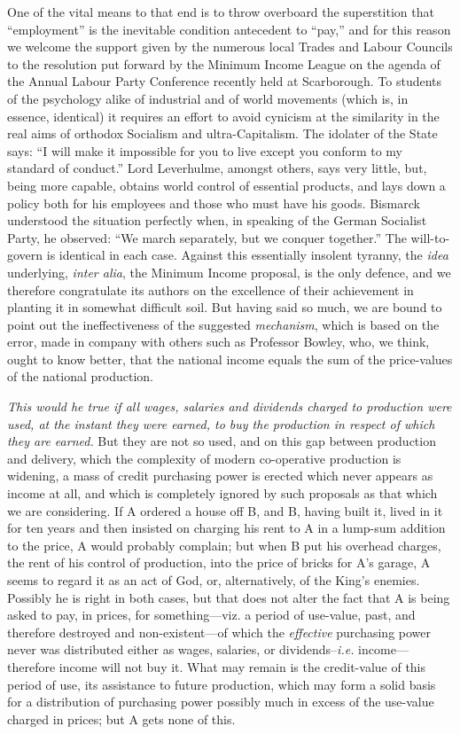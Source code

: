 \documentclass{book}
\begin{document}
One of the vital means to that end is to throw overboard the superstition that “employment” is the inevitable condition antecedent to “pay,” and for this reason we welcome the support given by the numerous local Trades and Labour Councils to the resolution put forward by the Minimum Income League on the agenda of the Annual Labour Party Conference recently held at Scarborough. To students of the psychology alike of industrial and of world movements (which is, in essence, identical) it requires an effort to avoid cynicism at the similarity in the real aims of orthodox Socialism and ultra-Capitalism. The idolater of the State says: “I will make it impossible for you to live except you conform to my standard of conduct.” Lord Leverhulme, amongst others, says very little, but, being more capable, obtains world control of essential products, and lays down a policy both for his employees and those who must have his goods. Bismarck understood the situation perfectly when, in speaking of the German Socialist Party, he observed: “We march separately, but we conquer together.” The will-to-govern is identical in each case. Against this essentially insolent tyranny, the \emph{idea} underlying, \emph{inter alia}, the Minimum Income proposal, is the only defence, and we therefore congratulate its authors on the excellence of their achievement in planting it in somewhat difficult soil. But having said so much, we are bound to point out the ineffectiveness of the suggested \emph{mechanism}, which is based on the error, made in company with others such as Professor Bowley, who, we think, ought to know better, that the national income equals the sum of the price-values of the national production.

\emph{This would he true if all wages, salaries and dividends charged to production were used, at the instant they were earned, to buy the production in respect of which they are earned.} But they are not so used, and on this gap between production and delivery, which the complexity of modern co-operative production is widening, a mass of credit purchasing power is erected which never appears as income at all, and which is completely ignored by such proposals as that which we are considering. If A ordered a house off B, and B, having built it, lived in it for ten years and then insisted on charging his rent to A in a lump-sum addition to the price, A would probably complain; but when B put his overhead charges, the rent of his control of production, into the price of bricks for A’s garage, A seems to regard it as an act of God, or, alternatively, of the King’s enemies. Possibly he is right in both cases, but that does not alter the fact that A is being asked to pay, in prices, for something—viz. a period of use-value, past, and therefore destroyed and non-existent—of which the \emph{effective} purchasing power never was distributed either as wages, salaries, or dividends–\emph{i.e.} income—therefore income will not buy it. What may remain is the credit-value of this period of use, its assistance to future production, which may form a solid basis for a distribution of purchasing power possibly much in excess of the use-value charged in prices; but A gets none of this.
\end{document}

